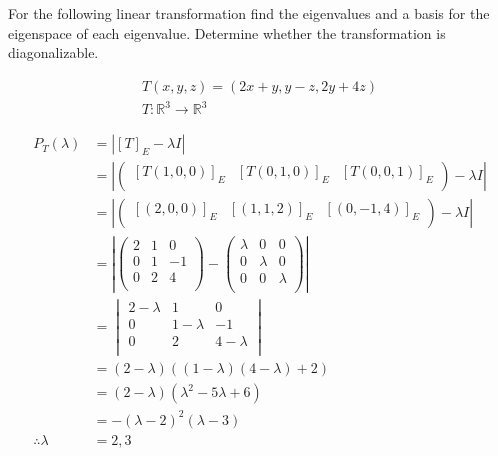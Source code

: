 \documentclass[fleqn, a4paper, draft]{amsart}
\makeatletter
\def\section{\@startsection{section}{1}%
	\z@{.7\linespacing\@plus\linespacing}{.5\linespacing}%
	{\normalfont\scshape}}%
\theoremstyle{definition}
\theoremstyle{theorem}
\theoremstyle{remark}
\numberwithin{corollary}{theorem}
\numberwithin{equation}{theorem}
\makeatother
\begin{document}
\section{For the following linear transformation find the eigenvalues and a basis for the eigenspace of each eigenvalue. Determine whether the transformation is diagonalizable.}

\begin{gather*}
	T(x,y,z) = (2x + y, y - z, 2y + 4z)\\
	T : \mathbb{R}^3 \to \mathbb{R}^3
\end{gather*}

\begin{align*}
	P_T (\lambda) &= \left\lvert [T]_E - \lambda I \right\rvert\\
	&= 
		\left\lvert
			\begin{pmatrix}
				[T(1,0,0)]_E & [T(0,1,0)]_E & [T(0,0,1)]_E\\
			\end{pmatrix}
			- \lambda I
		\right\rvert\\
	&= 
		\left\lvert
			\begin{pmatrix}
				[(2,0,0)]_E & [(1,1,2)]_E & [(0,-1,4)]_E\\
			\end{pmatrix}
			- \lambda I
		\right\rvert\\
	&= 
		\left\vert
			\begin{pmatrix}
				2 & 1 & 0\\
				0 & 1 & -1\\
				0 & 2 & 4\\
			\end{pmatrix}
			-
			\begin{pmatrix}
				\lambda & 0 & 0\\
				0 & \lambda & 0\\
				0 & 0 & \lambda\\
			\end{pmatrix}
		\right\rvert\\
	&= 
		\begin{vmatrix}
			2 - \lambda & 1 & 0\\
			0 & 1 - \lambda & -1\\
			0 & 2 & 4 - \lambda\\
		\end{vmatrix}\\
	&= (2 - \lambda) ((1 - \lambda) (4 - \lambda) + 2)\\
	&= (2 - \lambda) (\lambda^2 - 5 \lambda + 6)\\
	&= -(\lambda - 2)^2 (\lambda - 3)\\
	\therefore \lambda &= 2, 3
\end{align*}
\end{document}
